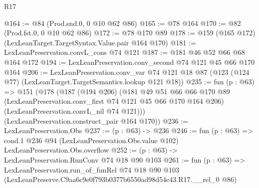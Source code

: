 \begin{lexlean}{R17}
\begin{coremodule}
@164 := @84 (Prod.snd.{0, 0} @10 @62 @86)
@165 := @78 @164
@170 := @82 (Prod.fst.{0, 0} @10 @62 @86)
@172 := @78 @170 @89
@178 := @159 (@165 @172) (LexLeanTarget.TargetSyntax.Value.pair @164 @170)
@181 := LexLeanPreservation.convL_cons @74 @121
@187 := @181 @46 @52 @66 @68 @164 @172
@194 := LexLeanPreservation.conv_second @74 @121 @45 @66 @170 @164
@206 := LexLeanPreservation.conv_var
    @74
    @121
    @18
    @87
    (@123 (@124 @77) (LexLeanTarget.TargetSemantics.lookup @121 @18))
@235 := fun (p : @63) =>
  @151
    (@178
      (@187
        (@194 @206)
        (@181
          @49
          @51
          @66
          @66
          @170
          @89
          (LexLeanPreservation.conv_first @74 @121 @45 @66 @170 @164 @206)
          (LexLeanPreservation.convL_nil @74 @121)))
      (LexLeanPreservation.construct_pair @164 @170))
@236 := LexLeanPreservation.Obs
@237 := (p : @63) -> @236
@246 := fun (p : @63) =>
  cond.{1} @236 @94 (LexLeanPreservation.Obs.value @102) LexLeanPreservation.Obs.overflow
@252 := (p : @63) -> LexLeanPreservation.RunConv @74 @18 @90 @103
@261 := fun (p : @63) =>
  LexLeanPreservation.run_of_funRel
    @74
    @18
    @90
    @103
    (LexLeanPreserve.C9aa6c9e0f793b0377b6550ad98d54e43.R17.__rel_0 @86)
\end{coremodule}
\end{lexlean}
